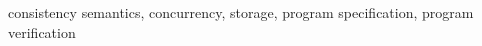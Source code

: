 \documentclass[journal,compsoc]{IEEEtran}
\begin{document}
{\begin{abstract}
\end{abstract}

\begin{IEEEkeywords}
consistency semantics, concurrency, storage,  program specification, program verification
\end{IEEEkeywords}}

\maketitle


\IEEEdisplaynontitleabstractindextext

%
\IEEEpeerreviewmaketitle
\end{document}
